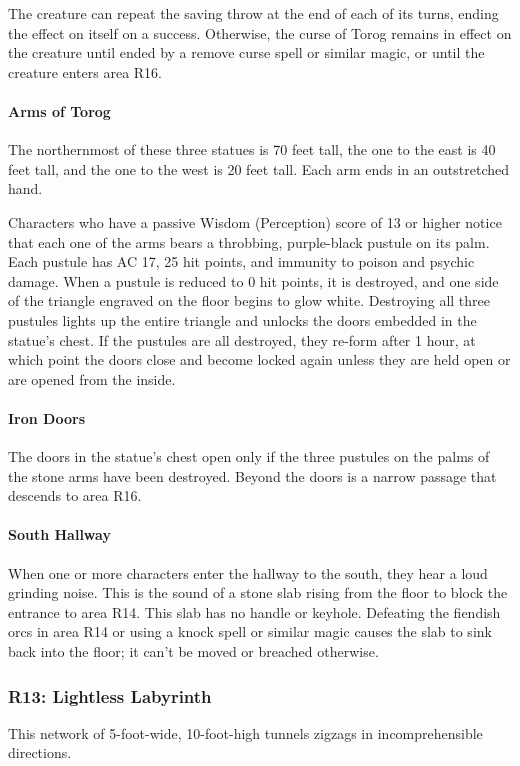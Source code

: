 \documentclass[10pt,a4paper,twoside,bg=print,twocolumn,openany,nodeprecatedcode]{dndbook}
\begin{document}
The creature can repeat the saving throw at the end of each of its turns, ending the effect on itself on a success. Otherwise, the curse of Torog remains in effect on the creature until ended by a remove curse spell or similar magic, or until the creature enters area R16.

\paragraph{Arms of Torog}
The northernmost of these three statues is 70 feet tall, the one to the east is 40 feet tall, and the one to the west is 20 feet tall. Each arm ends in an outstretched hand.

Characters who have a passive Wisdom (Perception) score of 13 or higher notice that each one of the arms bears a throbbing, purple-black pustule on its palm. Each pustule has AC 17, 25 hit points, and immunity to poison and psychic damage. When a pustule is reduced to 0 hit points, it is destroyed, and one side of the triangle engraved on the floor begins to glow white. Destroying all three pustules lights up the entire triangle and unlocks the doors embedded in the statue's chest. If the pustules are all destroyed, they re-form after 1 hour, at which point the doors close and become locked again unless they are held open or are opened from the inside.

\paragraph{Iron Doors}
The doors in the statue's chest open only if the three pustules on the palms of the stone arms have been destroyed. Beyond the doors is a narrow passage that descends to area R16.

\paragraph{South Hallway}
When one or more characters enter the hallway to the south, they hear a loud grinding noise. This is the sound of a stone slab rising from the floor to block the entrance to area R14. This slab has no handle or keyhole. Defeating the fiendish orcs in area R14 or using a knock spell or similar magic causes the slab to sink back into the floor; it can't be moved or breached otherwise.

\subsubsection{R13: Lightless Labyrinth}
This network of 5-foot-wide, 10-foot-high tunnels zigzags in incomprehensible directions.
\end{document}

